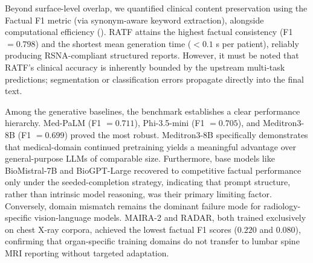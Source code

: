 \documentclass[journal]{IEEEtran}
\begin{document}
 
Beyond surface-level overlap, we quantified clinical content preservation using the Factual F1 metric (via synonym-aware keyword extraction), alongside computational efficiency (). RATF attains the highest factual consistency (F1 $= 0.798$) and the shortest mean generation time ($<0.1$ s per patient), reliably producing RSNA-compliant structured reports. However, it must be noted that RATF's clinical accuracy is inherently bounded by the upstream multi-task predictions; segmentation or classification errors propagate directly into the final text. 

Among the generative baselines, the benchmark establishes a clear performance hierarchy. Med-PaLM (F1 $= 0.711$), Phi-3.5-mini (F1 $= 0.705$), and Meditron3-8B (F1 $= 0.699$) proved the most robust. Meditron3-8B specifically demonstrates that medical-domain continued pretraining yields a meaningful advantage over general-purpose LLMs of comparable size. Furthermore, base models like BioMistral-7B and BioGPT-Large recovered to competitive factual performance only under the seeded-completion strategy, indicating that prompt structure, rather than intrinsic model reasoning, was their primary limiting factor. Conversely, domain mismatch remains the dominant failure mode for radiology-specific vision-language models. MAIRA-2 and RADAR, both trained exclusively on chest X-ray corpora, achieved the lowest factual F1 scores ($0.220$ and $0.080$), confirming that organ-specific training domains do not transfer to lumbar spine MRI reporting without targeted adaptation.
\end{document}
